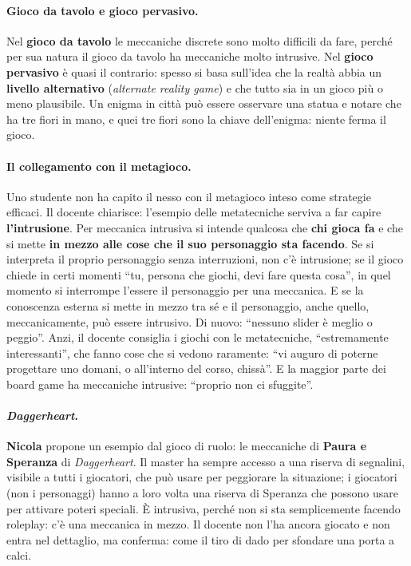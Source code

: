 \paragraph{Gioco da tavolo e gioco pervasivo.} Nel \textbf{gioco da tavolo} le
meccaniche discrete sono molto difficili da fare, perché per sua natura il gioco
da tavolo ha meccaniche molto intrusive. Nel \textbf{gioco pervasivo} è quasi il
contrario: spesso si basa sull'idea che la realtà abbia un \textbf{livello
alternativo} (\emph{alternate reality game}) e che tutto sia in un gioco più o
meno plausibile. Un enigma in città può essere osservare una statua e notare che
ha tre fiori in mano, e quei tre fiori sono la chiave dell'enigma: niente ferma
il gioco.

\paragraph{Il collegamento con il metagioco.} Uno studente non ha capito il nesso
con il metagioco inteso come strategie efficaci. Il docente chiarisce: l'esempio
delle metatecniche serviva a far capire \textbf{l'intrusione}. Per meccanica
intrusiva si intende qualcosa che \textbf{chi gioca fa} e che si mette
\textbf{in mezzo alle cose che il suo personaggio sta facendo}. Se si interpreta
il proprio personaggio senza interruzioni, non c'è intrusione; se il gioco chiede
in certi momenti ``tu, persona che giochi, devi fare questa cosa'', in quel
momento si interrompe l'essere il personaggio per una meccanica. E se la
conoscenza esterna si mette in mezzo tra sé e il personaggio, anche quello,
meccanicamente, può essere intrusivo. Di nuovo: ``nessuno slider è meglio o
peggio''. Anzi, il docente consiglia i giochi con le metatecniche, ``estremamente
interessanti'', che fanno cose che si vedono raramente: ``vi auguro di poterne
progettare uno domani, o all'interno del corso, chissà''. E la maggior parte dei
board game ha meccaniche intrusive: ``proprio non ci sfuggite''.

\paragraph{\emph{Daggerheart}.} \textbf{Nicola} propone un esempio dal gioco di
ruolo: le meccaniche di \textbf{Paura e Speranza} di \emph{Daggerheart}. Il
master ha sempre accesso a una riserva di segnalini, visibile a tutti i
giocatori, che può usare per peggiorare la situazione; i giocatori (non i
personaggi) hanno a loro volta una riserva di Speranza che possono usare per
attivare poteri speciali. È intrusiva, perché non si sta semplicemente facendo
roleplay: c'è una meccanica in mezzo. Il docente non l'ha ancora giocato e non
entra nel dettaglio, ma conferma: come il tiro di dado per sfondare una porta a
calci.

